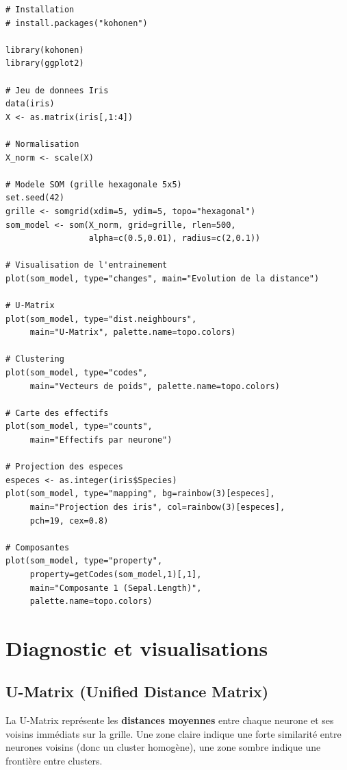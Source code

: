 \documentclass[a4paper,11pt]{article}
\theoremstyle{definition}
\begin{document}
\begin{lstlisting}[language=Rlang, caption=SOM avec le package kohonen]
# Installation
# install.packages("kohonen")

library(kohonen)
library(ggplot2)

# Jeu de donnees Iris
data(iris)
X <- as.matrix(iris[,1:4])

# Normalisation
X_norm <- scale(X)

# Modele SOM (grille hexagonale 5x5)
set.seed(42)
grille <- somgrid(xdim=5, ydim=5, topo="hexagonal")
som_model <- som(X_norm, grid=grille, rlen=500,
                 alpha=c(0.5,0.01), radius=c(2,0.1))

# Visualisation de l'entrainement
plot(som_model, type="changes", main="Evolution de la distance")

# U-Matrix
plot(som_model, type="dist.neighbours",
     main="U-Matrix", palette.name=topo.colors)

# Clustering
plot(som_model, type="codes",
     main="Vecteurs de poids", palette.name=topo.colors)

# Carte des effectifs
plot(som_model, type="counts",
     main="Effectifs par neurone")

# Projection des especes
especes <- as.integer(iris$Species)
plot(som_model, type="mapping", bg=rainbow(3)[especes],
     main="Projection des iris", col=rainbow(3)[especes],
     pch=19, cex=0.8)

# Composantes
plot(som_model, type="property",
     property=getCodes(som_model,1)[,1],
     main="Composante 1 (Sepal.Length)",
     palette.name=topo.colors)
\end{lstlisting}

\section{Diagnostic et visualisations}

\subsection{U-Matrix (Unified Distance Matrix)}
La U-Matrix représente les \textbf{distances moyennes} entre chaque neurone et ses voisins immédiats sur la grille. Une zone claire indique une forte similarité entre neurones voisins (donc un cluster homogène), une zone sombre indique une frontière entre clusters.
\end{document}
